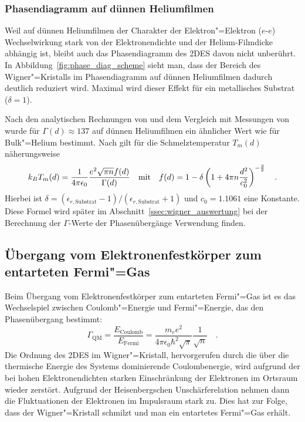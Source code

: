 \subsubsection{Phasendiagramm auf dünnen Heliumfilmen}
\label{ssec:phasediag_films}
Weil auf dünnen Heliumfilmen der Charakter der Elektron"=Elektron ($e$-$e$) Wechselwirkung stark von der Elektronendichte und der Helium-Filmdicke abhängig ist, bleibt auch das Phasendiagramm des 2DES davon nicht unberührt. In Abbildung~\ref{fig:phase_diag_scheme} sieht man, dass der Bereich des Wigner"=Kristalls im Phasendiagramm auf dünnen Heliumfilmen dadurch deutlich reduziert wird. Maximal wird dieser Effekt für ein metallisches Substrat ($\delta=1$).
\enlargethispage{2ex}

Nach den analytischen Rechnungen von  \cite{Sai89} und dem Vergleich mit Messungen von  wurde für $\Gamma(d)\approx137$ auf dünnen Heliumfilmen ein ähnlicher Wert wie für Bulk"=Helium bestimmt. Nach  gilt für die Schmelztemperatur $T_m(d)$ näherungsweise
\begin{equation}
	\label{eqn:wc_melting_temp}
	k_BT_m(d)=\frac1{4\pi\epsilon_0}\frac{e^2\sqrt{\pi n}f(d)}{\Gamma(d)}\quad\text{mit}\quad
	f(d)=1-\delta\left(1+4\pi n \frac{d^2}{c_0^2}\right)^{-\frac32}\quad.
\end{equation}
Hierbei ist $\delta=(\epsilon_{r,\text{Substrat}}-1)/(\epsilon_{r,\text{Substrat}}+1)$ und $c_0=1.1061$ eine Konstante. Diese Formel wird später im Abschnitt~\ref{ssec:wigner_auswertung} bei der Berechnung der $\Gamma$-Werte der Phasenübergänge Verwendung finden.

\subsection{Übergang vom Elektronenfestkörper zum entarteten Fermi"=Gas}
Beim Übergang vom Elektronenfestkörper zum entarteten Fermi"=Gas ist es das Wechselspiel zwischen Coulomb"=Energie und Fermi"=Energie, das den Phasenübergang bestimmt:
\begin{equation}
	\label{eqn:qm_Gamma}
	\Gamma_\text{QM}=\frac{E_\text{Coulomb}}{E_\text{Fermi}}
		=\frac{m_e e^2}{4\pi\epsilon_0\hbar^2 \sqrt{\pi}}\frac1{\sqrt{n}}\quad.
\end{equation}
Die Ordnung des 2DES im Wigner"=Kristall, hervorgerufen durch die über die thermische Energie des Systems dominierende Coulombenergie, wird aufgrund der bei hohen Elektronendichten starken Einschränkung der Elektronen im Ortsraum wieder zerstört. Aufgrund der Heisenbergschen Unschärferelation nehmen dann die Fluktuationen der Elektronen im Impulsraum stark zu. Dies hat zur Folge, dass der Wigner"=Kristall schmilzt und man ein entartetes Fermi"=Gas erhält.

